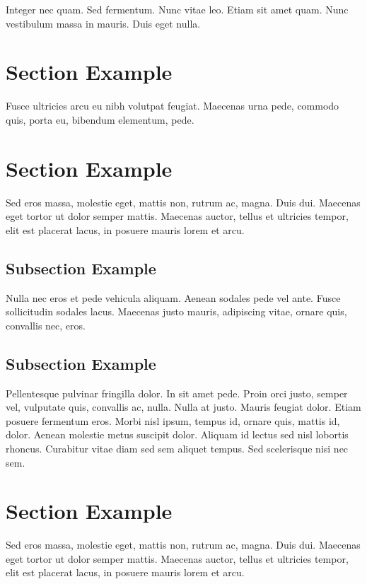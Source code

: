 Integer nec quam. Sed fermentum. Nunc vitae leo. Etiam sit amet
quam. Nunc vestibulum massa in mauris. Duis eget nulla. 

\section{Section Example}

Fusce ultricies arcu eu nibh volutpat feugiat. Maecenas urna pede, 
commodo quis, porta eu, bibendum elementum, pede. 

\section{Section Example}

Sed eros massa, molestie eget, mattis non, rutrum ac, magna. 
Duis dui. Maecenas eget tortor ut dolor semper mattis. 
Maecenas auctor, tellus et ultricies tempor, elit
est placerat lacus, in posuere mauris lorem et arcu. 

\subsection{Subsection Example}

Nulla nec eros et pede vehicula aliquam. Aenean sodales pede vel
ante. Fusce sollicitudin sodales lacus. Maecenas justo mauris,
adipiscing vitae, ornare quis, convallis nec, eros. 

\subsection{Subsection Example}

Pellentesque pulvinar fringilla dolor. In sit amet pede. 
Proin orci justo, semper vel, vulputate quis, convallis
ac, nulla. Nulla at justo. Mauris feugiat dolor. 
Etiam posuere fermentum eros. Morbi nisl ipsum, tempus id, 
ornare quis, mattis id, dolor. Aenean molestie metus 
suscipit dolor. Aliquam id lectus sed
nisl lobortis rhoncus. Curabitur vitae diam sed sem aliquet
tempus. Sed scelerisque nisi nec sem.

\section{Section Example}

Sed eros massa, molestie eget, mattis non, rutrum ac, magna. 
Duis dui. Maecenas eget tortor ut dolor semper mattis. 
Maecenas auctor, tellus et ultricies tempor, elit
est placerat lacus, in posuere mauris lorem et arcu. 

